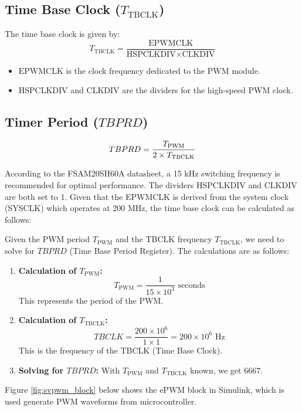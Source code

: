 \subsection{Time Base Clock (\( T_{\text{TBCLK}} \))}
The time base clock is given by:
\[
	T_{\text{TBCLK}} = \frac{\text{EPWMCLK}}{\text{HSPCLKDIV} \times \text{CLKDIV}}
\]
\begin{itemize}
	\item \( \text{EPWMCLK} \) is the clock frequency dedicated to the PWM module.
	\item \( \text{HSPCLKDIV} \) and \( \text{CLKDIV} \) are the dividers for the high-speed PWM clock.
\end{itemize}

\subsection{Timer Period (\( TBPRD \))}

\[
	TBPRD = {T_{\text{PWM}} \over 2 \times T_{\text{TBCLK}}}
\]

According to the FSAM20SH60A datasheet, a 15 kHz switching frequency is recommended for optimal performance. The dividers \( \text{HSPCLKDIV} \) and \( \text{CLKDIV} \) are both set to 1. Given that the EPWMCLK is derived from the system clock (SYSCLK) which operates at 200 MHz, the time base clock can be calculated as follows:

Given the PWM period \( T_{\text{PWM}} \) and the TBCLK frequency \( T_{\text{TBCLK}} \), we need to solve for \( TBPRD \) (Time Base Period Register). The calculations are as follows:

\begin{enumerate}
	\item \textbf{Calculation of \( T_{\text{PWM}} \):}
	      \[
		      T_{\text{PWM}} = \frac{1}{15 \times 10^3} \text{ seconds}
	      \]
	      This represents the period of the PWM.

	\item \textbf{Calculation of \( T_{\text{TBCLK}} \):}
	      \[
		      TBCLK = \frac{200 \times 10^6}{1 \times 1} = 200 \times 10^6 \text{ Hz}
	      \]
	      This is the frequency of the TBCLK (Time Base Clock).

	\item \textbf{Solving for \( TBPRD \):}
	      With \( T_{\text{PWM}} \) and \( T_{\text{TBCLK}} \) known, we get $6667$.
\end{enumerate}


Figure \ref{fig:svpwm_block} below shows the ePWM block in Simulink, which is used generate PWM waveforms from microcontroller.


